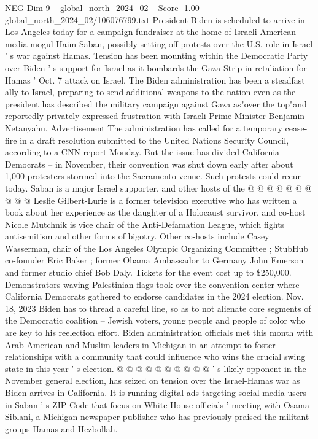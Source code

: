 \begin{textsample}{NEG Dim 9 – global\_north\_2024\_02 – Score -1.00 – global\_north\_2024\_02/106076799.txt}  \label{ex:f9_neg_245}
President Biden is scheduled to arrive in Los Angeles today for a campaign fundraiser at the home of Israeli American media mogul Haim Saban, possibly setting off protests over the U.S. role in Israel ' s war against Hamas.
Tension has been mounting within the Democratic Party over Biden ' s support for Israel as it bombards the Gaza Strip in retaliation for Hamas ' Oct. 7 attack on Israel.
The Biden administration has been a steadfast ally to Israel, preparing to send additional weapons to the nation even as the president has described the military campaign against Gaza as"over the top"and reportedly privately expressed frustration with Israeli Prime Minister Benjamin Netanyahu.
Advertisement The administration has called for a temporary cease-fire in a draft resolution submitted to the United Nations Security Council, according to a CNN report Monday.
But the issue has divided California Democrats -- in November, their convention was shut down early after about 1,000 protesters stormed into the Sacramento venue.
Such protests could recur today.
Saban is a major Israel supporter, and other hosts of the @ @ @ @ @ @ @ @ @ @ Leslie Gilbert-Lurie is a former television executive who has written a book about her experience as the daughter of a Holocaust survivor, and co-host Nicole Mutchnik is vice chair of the Anti-Defamation League, which fights antisemitism and other forms of bigotry.
Other co-hosts include Casey Wasserman, chair of the Los Angeles Olympic Organizing Committee ; StubHub co-founder Eric Baker ; former Obama Ambassador to Germany John Emerson and former studio chief Bob Daly.
Tickets for the event cost up to \$250,000.
Demonstrators waving Palestinian flags took over the convention center where California Democrats gathered to endorse candidates in the 2024 election.
Nov. 18, 2023 Biden has to thread a careful line, so as to not alienate core segments of the Democratic coalition -- Jewish voters, young people and people of color who are key to his reelection effort.
Biden administration officials met this month with Arab American and Muslim leaders in Michigan in an attempt to foster relationships with a community that could influence who wins the crucial swing state in this year ' s election. @ @ @ @ @ @ @ @ @ @ ' s likely opponent in the November general election, has seized on tension over the Israel-Hamas war as Biden arrives in California.
It is running digital ads targeting social media users in Saban ' s ZIP Code that focus on White House officials ' meeting with Osama Siblani, a Michigan newspaper publisher who has previously praised the militant groups Hamas and Hezbollah.

\end{textsample}
